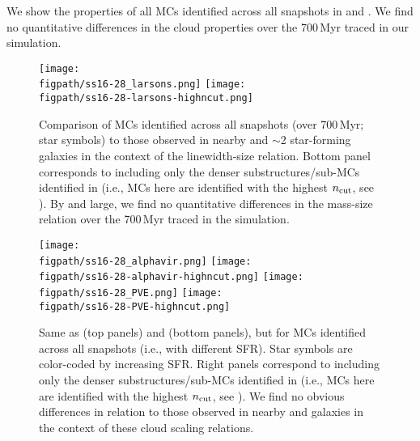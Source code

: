 \IfFileExists{emulateapjlegacy.cls}{\documentclass[iop]{emulateapjlegacy}}{\documentclass[iop]{emulateapj}}
\def\figpath{./Fig}
\begin{document}
We show the properties of all MCs identified across all snapshots
in  and .
We find no quantitative differences in the cloud properties over the 700\,Myr traced in our simulation.



\begin{figure*}[htbp]
\centering
\texttt{[image: \\figpath/ss16-28\_larsons.png]}
\texttt{[image: \\figpath/ss16-28-larsons-highncut.png]}
\caption{
Comparison of MCs identified across all snapshots (over 700\,Myr; star symbols)
to those observed in nearby and \z$\sim$2 star-forming galaxies
in the context of the linewidth-size relation.
Bottom panel corresponds to including only the denser substructures/sub-MCs identified in \flower
(i.e., MCs here are identified with the highest $n_{\rm cut}$, see ).
By and large, we find no quantitative differences in the mass-size relation over the 700\,Myr traced in the simulation.
\label{fig:larsons16-28}}
\end{figure*}

\begin{figure*}[htbp]
\centering
\texttt{[image: \\figpath/ss16-28\_alphavir.png]}
\texttt{[image: \\figpath/ss16-28-alphavir-highncut.png]}
\texttt{[image: \\figpath/ss16-28\_PVE.png]}
\texttt{[image: \\figpath/ss16-28-PVE-highncut.png]}
\caption{
Same as  (top panels) and  (bottom panels), but for MCs identified across all snapshots 
(i.e., with different SFR). Star symbols are color-coded by increasing SFR.
Right panels correspond to including only the denser substructures/sub-MCs identified in \flower
(i.e., MCs here are identified with the highest $n_{\rm cut}$, see ).
We find no obvious differences in relation to those observed in nearby and \highz 
galaxies in the context of these cloud scaling relations.
\label{fig:alpha16-28}}
\end{figure*}
\end{document}
